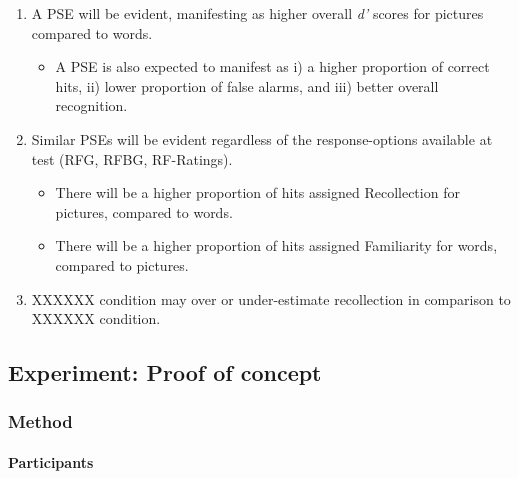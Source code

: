 \documentclass[
  11pt,
]{article}
\providecommand{\tightlist}{%
  \setlength{\itemsep}{0pt}\setlength{\parskip}{0pt}}
\begin{document}
\begin{enumerate}
\def\labelenumi{\arabic{enumi}.}
\tightlist
\item
  A PSE will be evident, manifesting as higher overall \emph{d'} scores
  for pictures compared to words.

  \begin{itemize}
  \tightlist
  \item
    A PSE is also expected to manifest as i) a higher proportion of
    correct hits, ii) lower proportion of false alarms, and iii) better
    overall recognition.
  \end{itemize}
\item
  Similar PSEs will be evident regardless of the response-options
  available at test (RFG, RFBG, RF-Ratings).

  \begin{itemize}
  \tightlist
  \item
    There will be a higher proportion of hits assigned Recollection for
    pictures, compared to words.
  \item
    There will be a higher proportion of hits assigned Familiarity for
    words, compared to pictures.
  \end{itemize}
\item
  XXXXXX condition may over or under-estimate recollection in comparison
  to XXXXXX condition.
\end{enumerate}

\hypertarget{experiment-proof-of-concept}{%
\subsection{Experiment: Proof of
concept}\label{experiment-proof-of-concept}}

\hypertarget{method}{%
\subsubsection{Method}\label{method}}

\hypertarget{participants}{%
\paragraph{Participants}\label{participants}}
\end{document}
